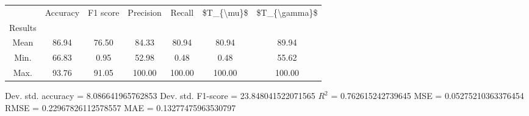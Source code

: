 \begin{tabular}{|c|c|c|c|c|c|c|}
\toprule
{} &  Accuracy &  F1 score &  Precision &  Recall &  \$T\_\{\textbackslash mu\}\$ &  \$T\_\{\textbackslash gamma\}\$ \\
Results &           &           &            &         &            &               \\
\hline
Mean    &     86.94 &     76.50 &      84.33 &   80.94 &      80.94 &         89.94 \\
Min.    &     66.83 &      0.95 &      52.98 &    0.48 &       0.48 &         55.62 \\
Max.    &     93.76 &     91.05 &     100.00 &  100.00 &     100.00 &        100.00 \\
\bottomrule
\end{tabular}

 Dev. std. accuracy = 8.086641965762853
 Dev. std. F1-score = 23.848041522071565
 $R^2$ = 0.762615242739645
 MSE = 0.05275210363376454
 RMSE = 0.22967826112578557
 MAE = 0.13277475963530797